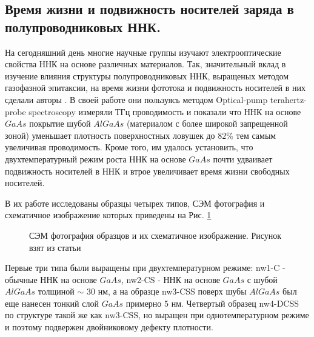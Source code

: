 \documentclass[a4paper,14pt,russian]{extreport}
\begin{document}
			\subsection{Время жизни и подвижность носителей заряда в полупроводниковых ННК.}
				На сегодняшний день многие научные группы изучают электрооптические свойства ННК на основе различных материалов. Так, значительный вклад в изучение влияния структуры полупроводниковых ННК, выращеных методом газофазной эпитаксии, на время жизни фототока и подвижность носителей в них сделали авторы \cite{CurrentLifetime}. В своей работе они пользуясь методом  Optical-pump terahertz-probe spectroscopy измеряли ТГц проводимость и показали что ННК на основе $GaAs$ покрытие шубой $AlGaAs$ (материалом с более широкой запрещенной зоной) уменьшает плотность поверхностных ловушек до $82 \%$ тем самым увеличивая проводимость. Кроме того, им удалось установить, что двухтемпературный режим роста ННК на основе $GaAs$ почти удваивает подвижность носителей в ННК и втрое увеличивает время жизни свободных носителей.\par
				В их работе исследованы образцы четырех типов, СЭМ фотография и схематичное изображение которых приведены на Рис. \ref{ris:NNWfromArticle}
				\begin{figure}[H]
					\caption{СЭМ фотография образцов и их схематичное изображение. Рисунок взят из статьи \cite{CurrentLifetime}}
				\label{ris:NNWfromArticle}
				\end{figure}
				Первые три типа были выращены при двухтемпературном режиме: nw1-C - обычные ННК на основе $GaAs$, nw2-CS - ННК на основе $GaAs$ с шубой $AlGaAs$ толщиной $\sim$ 30 нм, а на образце nw3-CSS поверх шубы $AlGaAs$ был еще нанесен тонкий слой $GaAs$ примерно 5 нм. Четвертый образец nw4-DCSS по структуре такой же как nw3-CSS, но выращен при однотемпературном режиме и поэтому подвержен двойниковому дефекту плотности.\par
\end{document}
